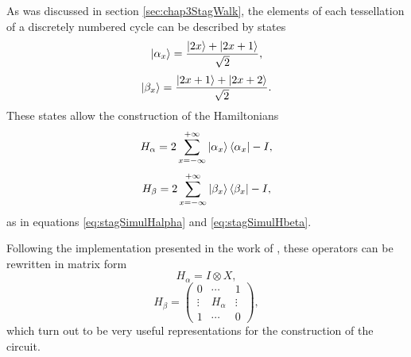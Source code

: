 \documentclass[../../dissertation.tex]{subfiles}
\begin{document}
As was discussed in section \ref{sec:chap3StagWalk}, the elements of each
tessellation of a discretely numbered cycle can be described by states
\begin{equation}
        \ket{\alpha_x} = \frac{\ket{2x} + \ket{2x+1}}{\sqrt{2}},
\end{equation}
\begin{equation}
        \ket{\beta_x} = \frac{\ket{2x+1}+\ket{2x+2}}{\sqrt{2}}.
\end{equation}
These states allow the construction of the Hamiltonians
\begin{equation}
        H_\alpha = 2\sum_{x=-\infty}^{+\infty}\ket{\alpha_{x}}\bra{\alpha_x} - I,
\end{equation}
\begin{equation}
        H_\beta = 2\sum_{x=-\infty}^{+\infty}\ket{\beta_{x}}\bra{\beta_x} - I,
\end{equation}
as in equations \eqref{eq:stagSimulHalpha} and \eqref{eq:stagSimulHbeta}.\par

Following the implementation presented in the work of \cite{acasiete2020},
these operators can be rewritten in matrix form 
\begin{equation}
	H_\alpha = I \otimes X,
\end{equation}
\begin{equation} 
	H_\beta = 
	\begin{pmatrix}
	0 & \cdots & 1\\
	\vdots & H_\alpha & \vdots\\
	1 & \cdots & 0
	\end{pmatrix},
\end{equation} 
which turn out to be very useful representations for the construction of the circuit.\par
\end{document}
